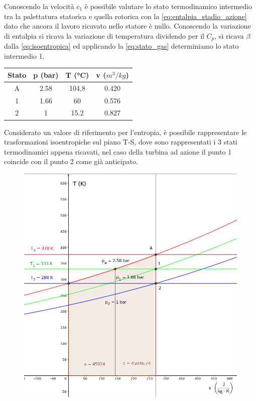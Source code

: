\documentclass[a4paper,12pt]{article}
\begin{document}
Conoscendo la velocità $c_1$ è possibile valutare lo stato termodinamico intermedio tra la palettatura statorica e quella rotorica con la \eqref{eq:entalpia_stadio_azione}
dato che ancora il lavoro ricavato nello statore è nullo.
Conoscendo la variazione di entalpia si ricava la variazione di temperatura dividendo per il $C_p$, si ricava $\beta$ dalla \eqref{eq:isoentropica}
ed applicando la \eqref{eq:stato_gas} determiniamo lo stato intermedio 1.

\begin{center}
    \begin{tabular}{c|c|c|c}
        Stato   &p (bar)    &T (°C) &v ($m^3/kg$) \\ \hline
        A       &2.58       &104,8  &0.420  \\
        1       &1.66       &60     &0.576  \\
        2       &1          &15.2   &0.827  
    \end{tabular}
\end{center}

Considerato un valore di riferimento per l'entropia, è possibile rappresentare le trasformazioni isoentropiche sul piano T-S, dove sono rappresentati i 3 stati termodinamici
appena ricavati, nel caso della turbina ad azione il punto 1 coincide con il punto 2 come già anticipato.
\begin{figure}[H]
    \label{fig:trasformazioni_TS}
    \centering
    \includegraphics[width=.55\linewidth]{media/trasformazioni_TS.png}
\end{figure}
\end{document}
